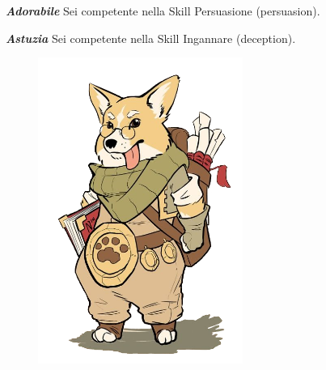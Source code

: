 \textit{\textbf{Adorabile}} Sei competente nella Skill Persuasione (persuasion).

\textit{\textbf{Astuzia}} Sei competente nella Skill Ingannare (deception).

\begin{figure}[t]
   \includegraphics[height=10cm]{2-Razze/2.2-FeyCorgi/Risorse/Fey_Corgi3.png}
\end{figure}

\clearpage
